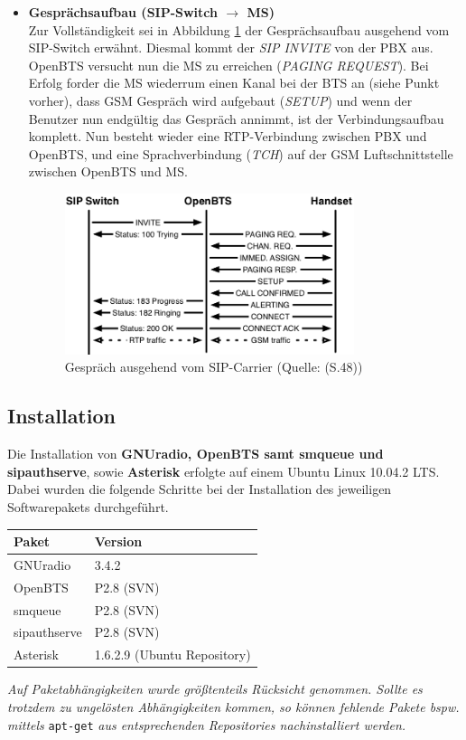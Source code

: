 \begin{itemize}
\item \textbf{Gesprächsaufbau (SIP-Switch $\rightarrow$ MS)}\\
Zur Vollständigkeit sei in Abbildung \ref{fig:openbts_call_carrierside} der Gesprächsaufbau ausgehend vom SIP-Switch erwähnt. Diesmal kommt der \textit{SIP INVITE} von der PBX aus. OpenBTS versucht nun die MS zu erreichen (\textit{PAGING REQUEST}). Bei Erfolg forder die MS wiederrum einen Kanal bei der BTS an (siehe Punkt vorher), dass GSM Gespräch wird aufgebaut (\textit{SETUP}) und wenn der Benutzer nun endgültig das Gespräch annimmt, ist der Verbindungsaufbau komplett. Nun besteht wieder eine RTP-Verbindung zwischen PBX und OpenBTS, und eine Sprachverbindung (\textit{TCH}) auf der GSM Luftschnittstelle zwischen OpenBTS und MS. 
\begin{figure}[h]
	\centering
		\includegraphics[width=0.80\textwidth]{img/openbts_call_carrierside.png}
	\caption{Gespräch ausgehend vom SIP-Carrier (Quelle: \cite{bib:openbtsmanual}(S.48))}
	\label{fig:openbts_call_carrierside}
\end{figure}
\end{itemize}

\subsection{Installation}
\label{sec:Installation}
Die Installation von \textbf{GNUradio, OpenBTS samt smqueue und sipauthserve}, sowie \textbf{Asterisk} erfolgte auf einem Ubuntu Linux 10.04.2 LTS. Dabei wurden die folgende Schritte bei der Installation des jeweiligen Softwarepakets durchgeführt.\\
\begin{center}
\begin{tabular}{l|l}
\textbf{Paket} & \textbf{Version}\\
\hline 
GNUradio & 3.4.2\\
OpenBTS & P2.8 (SVN)\\
smqueue & P2.8 (SVN)\\
sipauthserve & P2.8 (SVN)\\
Asterisk & 1.6.2.9 (Ubuntu Repository)\\
\end{tabular}
\end{center}
\textit{Auf Paketabhängigkeiten wurde größtenteils Rücksicht genommen. Sollte es trotzdem zu ungelösten Abhängigkeiten kommen, so können fehlende Pakete bspw. mittels} \verb|apt-get| \textit{aus entsprechenden Repositories nachinstalliert werden.}

